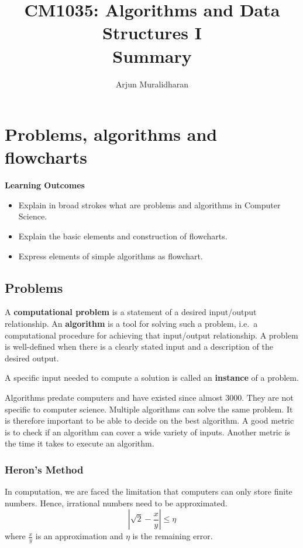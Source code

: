 
\title{CM1035: Algorithms and Data Structures I\\ Summary}
\author{Arjun Muralidharan}



\section{Problems, algorithms and
flowcharts}

\begin{mdframed}
\textbf{Learning Outcomes}
\begin{itemize}[label={\checkmark}]
\item Explain in broad strokes what are  problems and algorithms in Computer Science.
\item Explain the basic elements and construction of flowcharts.
\item Express elements of simple algorithms as flowchart.
\end{itemize}
\end{mdframed}

\subsection{Problems}
A \textbf{computational problem} is a statement of a desired input/output relationship. An \textbf{algorithm} is a tool for solving such a problem, i.e.~a computational procedure for achieving that input/output relationship. A problem is well-defined when there is a clearly stated input and a description of the desired output.

A specific input needed to compute a solution is called an \textbf{instance} of a problem.

Algorithms predate computers and have existed since almost 3000. They are not specific to computer science. Multiple algorithms can solve the same problem. It is therefore important to be able to decide on the best algorithm. A good metric is to check if an algorithm can cover a wide variety of inputs. Another metric is the time it takes to execute an algorithm.

\subsubsection{Heron's Method}
In computation, we are faced the limitation that computers can only store finite numbers. Hence, irrational numbers need to be approximated.
\begin{equation*}
\left|\sqrt{2}-\frac{x}{y}\right| \leq \eta
\end{equation*}
where \(\frac{x}{y}\) is an approximation and \(\eta \) is the remaining error.

